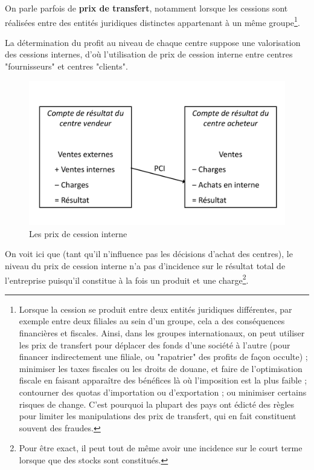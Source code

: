 \documentclass[oneside]{kaobook}
\begin{document}
On parle parfois de \textbf{prix de transfert}, notamment lorsque les cessions sont réalisées entre des entités juridiques distinctes appartenant à un même groupe\footnote{Lorsque la cession se produit entre deux entités juridiques différentes, par exemple entre deux filiales au sein d’un groupe, cela a des conséquences financières et fiscales. Ainsi, dans les groupes internationaux, on peut utiliser les prix de transfert pour déplacer des fonds d’une société à l’autre (pour financer indirectement une filiale, ou "rapatrier" des profits de façon occulte) ; minimiser les taxes fiscales ou les droits de douane, et faire de l’optimisation fiscale en faisant apparaître des bénéfices là où l’imposition est la plus faible ; contourner des quotas d’importation ou d’exportation ; ou minimiser certains risques de change. C’est pourquoi la plupart des pays ont édicté des règles pour limiter les manipulations des prix de transfert, qui en fait constituent souvent des fraudes.}.

La détermination du profit au niveau de chaque centre suppose une valorisation des cessions internes, d’où l’utilisation de prix de cession interne entre centres "fournisseurs" et centres "clients".

\begin{figure}[H]

\includegraphics{./img/pciresult.pdf}
\caption{Les prix de cession interne}
\end{figure}

On voit ici que (tant qu’il n’influence pas les décisions d’achat des centres), le niveau du prix de cession interne n’a pas d’incidence sur le résultat total de l’entreprise puisqu’il constitue à la fois un produit et une charge\footnote{Pour être exact, il peut tout de même avoir une incidence sur le court terme lorsque que des stocks sont constitués.}.
\end{document}
